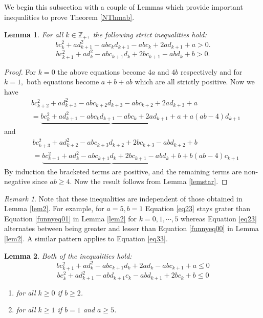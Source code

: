 \documentclass[12pt,reqno]{amsart}
\theoremstyle{plain}
\newtheorem{lem}{Lemma}
\theoremstyle{definition}
\theoremstyle{remark}
\newtheorem{rem}{Remark}
\newcommand\bz{\mathbb Z}
\begin{document}
\subsection{} We begin this subsection with a couple of Lemmas which provide important inequalities to prove Theorem \ref{NThmab}.
\begin{lem}\label{lem41}
    For all $k\in\bz_+,$ the following strict inequalities hold:
    \begin{equation}\label{eq23}
        bc_k^2+ad_{k+1}^2-abc_kd_{k+1}-abc_k+2ad_{k+1}+a> 0.
    \end{equation}
    \begin{equation}\label{eq33}
        bc_{k+1}^2+ad_{k}^2-abc_{k+1}d_{k}+2bc_{k+1}-abd_{k}+b> 0.
    \end{equation}
\end{lem}
\begin{proof}
    For $k=0$ the above equations become $4a$ and $4b$ respectively and for $k=1,$ both equations become $a+b+ab$ which are all strictly positive. Now we have 
    \begin{align*}
        &bc_{k+2}^2+ad_{k+3}^2-abc_{k+2}d_{k+3}-abc_{k+2}+2ad_{k+3}+a\\&=        \underbrace{bc_k^2+ad_{k+1}^2-abc_kd_{k+1}-abc_k+2ad_{k+1}+a}+a(ab-4)d_{k+1}
    \end{align*}
    and
    \begin{align*}
        & bc_{k+3}^2+ad_{k+2}^2-abc_{k+3}d_{k+2}+2bc_{k+3}-abd_{k+2}+b\\&=        \underbrace{bc_{k+1}^2+ad_{k}^2-abc_{k+1}d_{k}+2bc_{k+1}-abd_{k}+b}+b(ab-4)c_{k+1}
    \end{align*}
    By induction the bracketed terms are positive, and the remaining terms are non-negative since $ab\geq 4$. Now the result follows from Lemma \ref{lemstar}.
\end{proof}
\begin{rem}
    Note that these inequalities are independent of those obtained in Lemma \ref{lem2}. For example, for $a=5,b=1$ Equation \ref{eq23} stays grater than Equation \ref{funnyeq01} in Lemma \ref{lem2} for $k=0,1,\cdots,5$ whereas Equation \ref{eq23} alternates between being greater and lesser than Equation \ref{funnyeq00} in Lemma \ref{lem2}. A similar pattern applies to Equation \ref{eq33}.
\end{rem}


\begin{lem}\label{lem42}
    Both of the inequalities hold:
    \begin{equation}\label{eq24}
    bc_{k+1}^2+ad_k^2-abc_{k+1}d_k+2ad_k-abc_{k+1}+a\leq 0
    \end{equation}
    \begin{equation}\label{eq34}
    bc_k^2+ad_{k+1}^2-abd_{k+1}c_k-abd_{k+1}+2bc_k+b\leq 0
    \end{equation}
    \begin{enumerate}
        \item for all $k\geq 0$ if $b\geq2$.
        \item for all $k\geq 1$ if $b=1$ and $a\geq 5$.
    \end{enumerate}
\end{lem}
\end{document}

